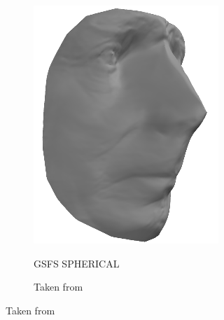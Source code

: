 \begin{figure}
\begin{subfigure}{0.23\textwidth}
\label{fig:samuel-beckett-input}
    \end{subfigure}
    \begin{subfigure}{0.23\textwidth}
        \centering
        \caption*{GSFS SPHERICAL}
        \includegraphics[width=\textwidth]{statistical_normals/images/gsfs_results/celebrities/samuel_beckett_spherical.png}
\label{fig:samuel-beckett-no-texture}
    \end{subfigure}
    \begin{subfigure}{0.23\textwidth}
        \centering
        \caption*{Taken from~\cite{kemelmacher2011facereconstruction}}

\end{subfigure}
\end{figure}
